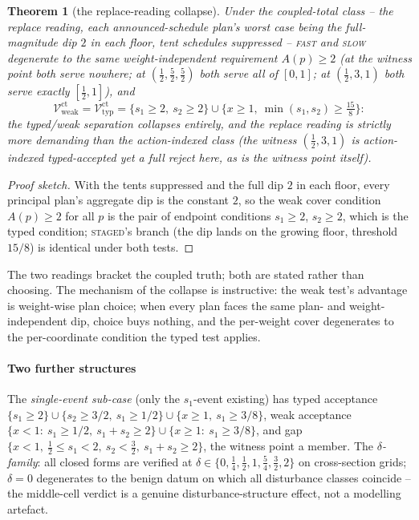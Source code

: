 \documentclass[preprint,11pt,authoryear]{elsarticle}
\newtheorem{theorem}{Theorem}
\theoremstyle{remark}
\newcommand{\Vtyp}{\mathcal{V}_{\mathrm{typ}}}
\newcommand{\Vweak}{\mathcal{V}_{\mathrm{weak}}}
\newcommand{\act}[1]{\textsc{#1}}
\begin{document}
\begin{theorem}[the replace-reading collapse]\label{thm:replace}
Under the coupled-total class -- the replace reading, each announced-schedule plan's worst case being the full-magnitude dip $2$ in each floor, tent schedules suppressed -- \act{fast} and \act{slow} degenerate to the same weight-independent requirement $A(p)\ge2$ (at the witness point both serve nowhere; at $(\tfrac12,\tfrac52,\tfrac52)$ both serve all of $[0,1]$; at $(\tfrac12,3,1)$ both serve exactly $[\tfrac12,1]$), and
\[
\Vweak^{\mathrm{ct}}=\Vtyp^{\mathrm{ct}}=\{s_1\ge2,\ s_2\ge2\}\cup\{x\ge1,\ \min(s_1,s_2)\ge\tfrac{15}8\}:
\]
the typed/weak separation collapses entirely, and the replace reading is strictly more demanding than the action-indexed class (the witness $(\tfrac12,3,1)$ is action-indexed typed-accepted yet a full reject here, as is the witness point itself).
\end{theorem}
\begin{proof}[Proof sketch]
With the tents suppressed and the full dip $2$ in each floor, every principal plan's aggregate dip is the constant $2$, so the weak cover condition $A(p)\ge2$ for all $p$ is the pair of endpoint conditions $s_1\ge2$, $s_2\ge2$, which is the typed condition; \act{staged}'s branch (the dip lands on the growing floor, threshold $15/8$) is identical under both tests.
\end{proof}

The two readings bracket the coupled truth; both are stated rather than choosing. The mechanism of the collapse is instructive: the weak test's advantage is weight-wise plan choice; when every plan faces the same plan- and weight-independent dip, choice buys nothing, and the per-weight cover degenerates to the per-coordinate condition the typed test applies.

\paragraph{Two further structures} The \emph{single-event sub-case} (only the $s_1$-event existing) has typed acceptance $\{s_1\ge2\}\cup\{s_2\ge3/2,\ s_1\ge1/2\}\cup\{x\ge1,\ s_1\ge3/8\}$, weak acceptance $\{x<1:\ s_1\ge1/2,\ s_1+s_2\ge2\}\cup\{x\ge1:\ s_1\ge3/8\}$, and gap $\{x<1,\ \tfrac12\le s_1<2,\ s_2<\tfrac32,\ s_1+s_2\ge2\}$, the witness point a member. The \emph{$\delta$-family}: all closed forms are verified at $\delta\in\{0,\tfrac14,\tfrac12,1,\tfrac54,\tfrac32,2\}$ on cross-section grids; $\delta=0$ degenerates to the benign datum on which all disturbance classes coincide -- the middle-cell verdict is a genuine disturbance-structure effect, not a modelling artefact.
\end{document}
